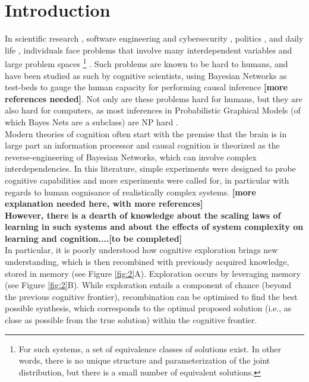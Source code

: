 \section{Introduction}
In scientific research \cite{hisano2013challenges}, software engineering and cybersecurity \cite{littlewood1989predicting,maillart2017given}, politics \cite{clinton2014hard}, and daily life \cite{gerson1986hard}, individuals face problems that involve many interdependent variables and large problem spaces \footnote{For such systems, a set of equivalence classes of solutions exist. In other words, there is no unique structure and parameterization of the joint distribution, but there is a small number of equivalent solutions.} \cite{koller09, Pearl2009CMR}. Such problems are known to be hard to humans, and have been studied as such by cognitive scientists, using Bayesian Networks as test-beds to gauge the human capacity for performing causal inference \cite{bramley2015staying} {\bf [more references needed]}. Not only are these problems hard for humans, but they are also hard for computers, as most inferences in Probabilistic Graphical Models (of which Bayes Nets are a subclass) are NP hard \cite{koller09}.\\ 

Modern theories of cognition often start with the premise that the brain is in large part an information processor \cite{Tenenbaum06theory-basedbayesian} and causal cognition is theorized as the reverse-engineering of Bayesian Networks, which can involve complex interdependencies. In this literature, simple experiments were designed to probe cognitive capabilities \cite{tenenbaum2001structure} and more experiments were called for, in particular with regards to human cognisance of realistically complex systems. {\bf [more explanation needed here, with more references]}\\

{\bf However, there is a dearth of knowledge about the scaling laws of learning in such systems and about the effects of system complexity on learning and cognition....[to be completed]}\\

In particular, it is poorly understood how cognitive exploration brings new understanding, which is then recombined with previously acquired knowledge, stored in memory (see Figure \ref{fig:2}A). Exploration occurs by leveraging memory (see Figure \ref{fig:2}B). While exploration entails a component of chance (beyond the previous cognitive frontier), recombination can be optimised to find the best possible synthesis, which corresponds to the optimal proposed solution (i.e., as close as possible from the true solution) within the cognitive frontier.\\

